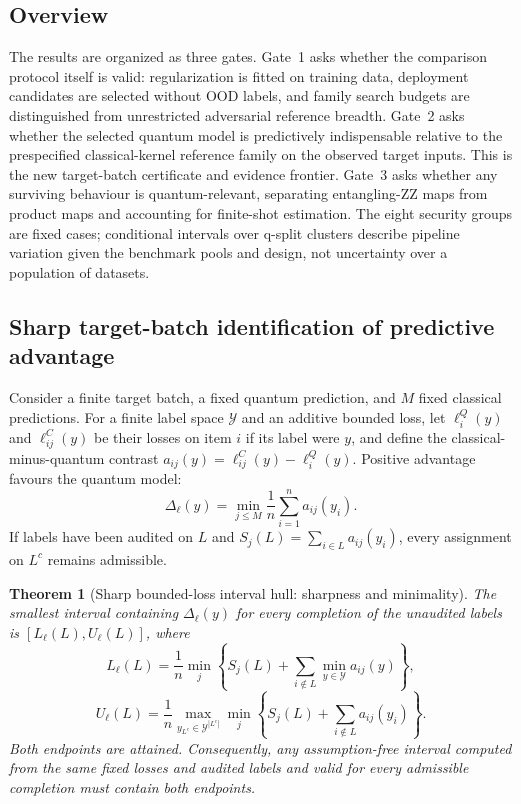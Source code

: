 \documentclass[referee,lineno,pdflatex,sn-nature]{sn-jnl}
\theoremstyle{thmstyleone}%
\newtheorem{theorem}{Theorem}%
\theoremstyle{thmstyletwo}%
\theoremstyle{thmstylethree}%
\begin{document}
\subsection{Overview}

The results are organized as three gates. Gate~1 asks whether the comparison protocol itself is valid: regularization is fitted on training data, deployment candidates are selected without OOD labels, and family search budgets are distinguished from unrestricted adversarial reference breadth. Gate~2 asks whether the selected quantum model is predictively indispensable relative to the prespecified classical-kernel reference family on the observed target inputs. This is the new target-batch certificate and evidence frontier. Gate~3 asks whether any surviving behaviour is quantum-relevant, separating entangling-ZZ maps from product maps and accounting for finite-shot estimation. The eight security groups are fixed cases; conditional intervals over q-split clusters describe pipeline variation given the benchmark pools and design, not uncertainty over a population of datasets.

\subsection{Sharp target-batch identification of predictive advantage}
\label{sec:res_certificate}

Consider a finite target batch, a fixed quantum prediction, and $M$ fixed classical predictions. For a finite label space $\mathcal Y$ and an additive bounded loss, let $\ell_i^Q(y)$ and $\ell_{ij}^C(y)$ be their losses on item $i$ if its label were $y$, and define the classical-minus-quantum contrast $a_{ij}(y)=\ell_{ij}^C(y)-\ell_i^Q(y)$. Positive advantage favours the quantum model:
\[
\Delta_\ell(y)=\min_{j\leq M}\frac1n\sum_{i=1}^n a_{ij}(y_i).
\]
If labels have been audited on $L$ and $S_j(L)=\sum_{i\in L}a_{ij}(y_i)$, every assignment on $L^c$ remains admissible.

\begin{theorem}[Sharp bounded-loss interval hull: sharpness and minimality]
\label{thm:bounded_loss}
The smallest interval containing $\Delta_\ell(y)$ for every completion of the unaudited labels is $[L_\ell(L),U_\ell(L)]$, where
\[
L_\ell(L)=\frac1n\min_j\left\{S_j(L)+
\sum_{i\notin L}\min_{y\in\mathcal Y}a_{ij}(y)\right\},
\]
\[
U_\ell(L)=\frac1n\max_{y_{L^c}\in\mathcal Y^{|L^c|}}
\min_j\left\{S_j(L)+\sum_{i\notin L}a_{ij}(y_i)\right\}.
\]
Both endpoints are attained. Consequently, any assumption-free interval computed from the same fixed losses and audited labels and valid for every admissible completion must contain both endpoints.
\end{theorem}
\end{document}
